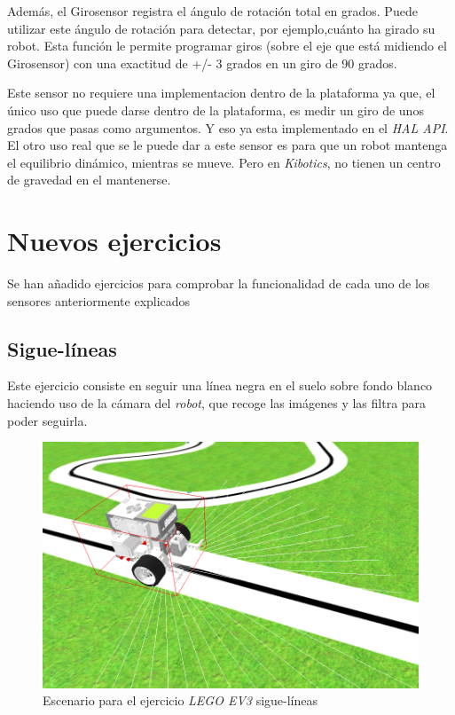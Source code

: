 Además, el Girosensor registra el ángulo de rotación total en grados. Puede utilizar este ángulo de rotación para detectar, por ejemplo,cuánto ha girado su robot. Esta función le permite programar giros (sobre el eje que está midiendo el Girosensor) con una exactitud de +/- 3 grados en un giro de 90 grados.

Este sensor no requiere una implementacion dentro de la plataforma ya que, el único uso que puede darse dentro de la plataforma, es medir un giro de unos grados que pasas como argumentos. Y eso ya esta implementado en el \textit{HAL API}. El otro uso real que se le puede dar a este sensor es para que un robot mantenga el equilibrio dinámico, mientras se mueve. Pero en \textit{Kibotics}, no tienen un centro de gravedad en el mantenerse.

  
\section{Nuevos ejercicios}
\label{sec:ejercicios}

Se han añadido ejercicios para comprobar la funcionalidad de cada uno de los sensores anteriormente explicados 

\subsection{Sigue-líneas}
    Este ejercicio consiste en seguir una línea negra en el suelo sobre fondo blanco haciendo uso de la cámara del \textit{robot}, que recoge las imágenes y las filtra para poder seguirla.
    
    
    \begin{figure}[H]
    \centering
    \includegraphics[scale=0.4]{img/siguelineas.png}
    \caption{Escenario para el ejercicio \textit{LEGO EV3} sigue-líneas} \label{fig:siguelinea}
    \end{figure}
    
